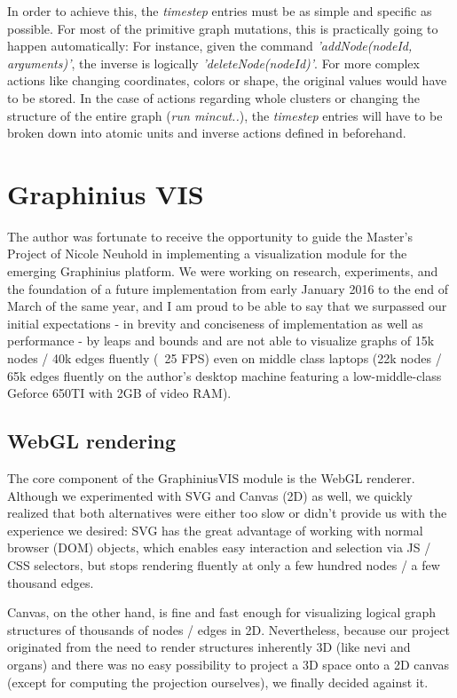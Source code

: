 	In order to achieve this, the \textit{timestep} entries must be as simple and specific as possible. For most of the primitive graph mutations, this is practically going to happen automatically: For instance, given the command \textit{'addNode(nodeId, arguments)'}, the inverse is logically \textit{'deleteNode(nodeId)'}. For more complex actions like changing coordinates, colors or shape, the original values would have to be stored. In the case of actions regarding whole clusters or changing the structure of the entire graph (\textit{run mincut..}), the \textit{timestep} entries will have to be broken down into atomic units and inverse actions defined in beforehand.


\section{Graphinius VIS}
\label{sect:graphinius_vis}

	The author was fortunate to receive the opportunity to guide the Master's Project of Nicole Neuhold in implementing a visualization module for the emerging Graphinius platform. We were working on research, experiments, and the foundation of a future implementation from early January 2016 to the end of March of the same year, and I am proud to be able to say that we surpassed our initial expectations - in brevity and conciseness of implementation as well as performance - by leaps and bounds and are not able to visualize graphs of 15k nodes / 40k edges fluently (~25 FPS) even on middle class laptops (22k nodes / 65k edges fluently on the author's desktop machine featuring a low-middle-class Geforce 650TI with 2GB of video RAM).
	
	\subsection{WebGL rendering}
	\label{ssect:webgl_rendering}
	
	The core component of the GraphiniusVIS module is the WebGL renderer. Although we experimented with SVG and Canvas (2D) as well, we quickly realized that both alternatives were either too slow or didn't provide us with the experience we desired: SVG has the great advantage of working with normal browser (DOM) objects, which enables easy interaction and selection via JS / CSS selectors, but stops rendering fluently at only a few hundred nodes / a few thousand edges.
	
	Canvas, on the other hand, is fine and fast enough for visualizing logical graph structures of thousands of nodes / edges in 2D. Nevertheless, because our project originated from the need to render structures  inherently 3D (like nevi and organs) and there was no easy possibility to project a 3D space onto a 2D canvas (except for computing the projection ourselves), we finally decided against it.
	
